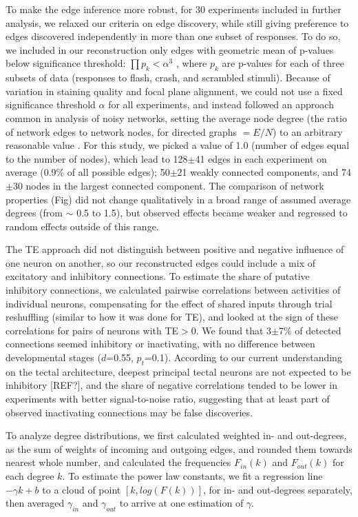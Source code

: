 \documentclass{article}
\begin{document}
To make the edge inference more robust, for 30 experiments included in further analysis, we relaxed our criteria on edge discovery, while still giving preference to edges discovered independently in more than one subset of responses. To do so, we included in our reconstruction only edges with geometric mean of p-values below significance threshold: $\prod{p_k}<\alpha^3$ , where $p_k$ are p-values for each of three subsets of data (responses to flash, crash, and scrambled stimuli). Because of variation in staining quality and focal plane alignment, we could not use a fixed significance threshold $\alpha$ for all experiments, and instead followed an approach common in analysis of noisy networks, setting the average node degree (the ratio of network edges to network nodes, for directed graphs $=E/N$) to an arbitrary reasonable value \citep{stetter2012te}. For this study, we picked a value of 1.0 (number of edges equal to the number of nodes), which lead to 128$\pm$41 edges in each experiment on average (0.9\% of all possible edges); 50$\pm$21 weakly connected components, and 74$\pm$30 nodes in the largest connected component. The comparison of network properties (Fig) did not change qualitatively in a broad range of assumed average degrees (from $\sim$ 0.5 to 1.5), but observed effects became weaker and regressed to random effects outside of this range.

The TE approach did not distinguish between positive and negative influence of one neuron on another, so our reconstructed edges could include a mix of excitatory and inhibitory connections. To estimate the share of putative inhibitory connections, we calculated pairwise correlations between activities of individual neurons, compensating for the effect of shared inputs through trial reshuffling (similar to how it was done for TE), and looked at the sign of these correlations for pairs of neurons with TE$>$0. We found that 3$\pm$7\% of detected connections seemed inhibitory or inactivating, with no difference between developmental stages ($d$=0.55, $p_t$=0.1). According to our current understanding on the tectal architecture, deepest principal tectal neurons are not expected to be inhibitory [REF?], and the share of negative correlations tended to be lower in experiments with better signal-to-noise ratio, suggesting that at least part of observed inactivating connections may be false discoveries.

To analyze degree distributions, we first calculated weighted in- and out-degrees, as the sum of weights of incoming and outgoing edges, and rounded them towards nearest whole number, and calculated the frequencies $F_{in}(k)$ and $F_{out}(k)$ for each degree $k$. To estimate the power law constants, we fit a regression line $-\gamma k + b$ to a cloud of point $[k , log(F(k)) ]$, for in- and out-degrees separately, then averaged $\gamma_{in}$ and $\gamma_{out}$ to arrive at one estimation of $\gamma$.
\end{document}
